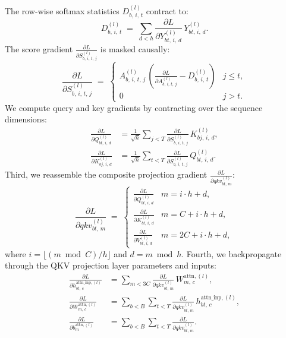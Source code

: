 \documentclass[letterpaper, 10 pt, conference]{ieeeconf}
\newcommand{\pdv}[2]{\frac{\partial #1}{\partial #2}}
\newcommand{\dL}[1]{\pdv{L}{#1}}
\theoremstyle{definition}
\begin{document}
The row-wise softmax statistics $D^{(l)}_{b,\, i,\, t}$ contract to:
\begin{equation}
  D^{(l)}_{b,\, i,\, t} \;=\; \sum_{d<h} \dL{Y^{(l)}_{bt,\, i,\, d}}\,Y^{(l)}_{bt,\, i,\, d}.
  \label{eq:full-dstats-attn}
\end{equation}
The score gradient $\dL{S^{(l)}_{b,\, i,\, t,\, j}}$ is masked causally:
\begin{equation}
  \dL{S^{(l)}_{b,\, i,\, t,\, j}} \;=\; \begin{cases}
    A^{(l)}_{b,\, i,\, t,\, j}\,\left( \dL{A^{(l)}_{b,\, i,\, t,\, j}} - D^{(l)}_{b,\, i,\, t} \right) & j \leq t, \\
    0                                                                                                  & j > t.
  \end{cases}
  \label{eq:full-ds}
\end{equation}
We compute query and key gradients by contracting over the sequence dimensions:
\begin{align}
  \dL{Q^{(l)}_{bt,\, i,\, d}}
   & = \frac{1}{\sqrt{h}} \sum_{j<T} \dL{S^{(l)}_{b,\, i,\, t,\, j}}\,K^{(l)}_{bj,\, i,\, d},
  \label{eq:full-dq}                                                                          \\
  \dL{K^{(l)}_{bj,\, i,\, d}}
   & = \frac{1}{\sqrt{h}} \sum_{t<T} \dL{S^{(l)}_{b,\, i,\, t,\, j}}\,Q^{(l)}_{bt,\, i,\, d}.
  \label{eq:full-dk}
\end{align}
Third, we reassemble the composite projection gradient $\dL{qkv^{(l)}_{bt,\, m}}$:
\begin{equation}
  \dL{qkv^{(l)}_{bt,\, m}} \;=\; \begin{cases}
    \dL{Q^{(l)}_{bt,\, i,\, d}} & m = i \cdot h + d,      \\
    \dL{K^{(l)}_{bt,\, i,\, d}} & m = C + i \cdot h + d,  \\
    \dL{V^{(l)}_{bt,\, i,\, d}} & m = 2C + i \cdot h + d,
  \end{cases}
  \label{eq:full-dqkv-reassemble}
\end{equation}
where $i = \lfloor (m \bmod C) / h \rfloor$ and $d = m \bmod h$.
Fourth, we backpropagate through the QKV projection layer parameters and inputs:
\begin{align}
  \dL{h^{\text{attn\_inp}, (l)}_{bt,\, c}}
   & = \sum_{m<3C} \dL{qkv^{(l)}_{bt,\, m}}\,W^{\text{attn}, (l)}_{m,\, c},
  \label{eq:full-dhattninp}                                                                 \\
  \dL{W^{\text{attn}, (l)}_{m,\, c}}
   & = \sum_{b<B} \sum_{t<T} \dL{qkv^{(l)}_{bt,\, m}}\,h^{\text{attn\_inp}, (l)}_{bt,\, c},
  \label{eq:full-dwattn}                                                                    \\
  \dL{b^{\text{attn}, (l)}_{m}}
   & = \sum_{b<B} \sum_{t<T} \dL{qkv^{(l)}_{bt,\, m}}.
  \label{eq:full-dbattn}
\end{align}
\end{document}
